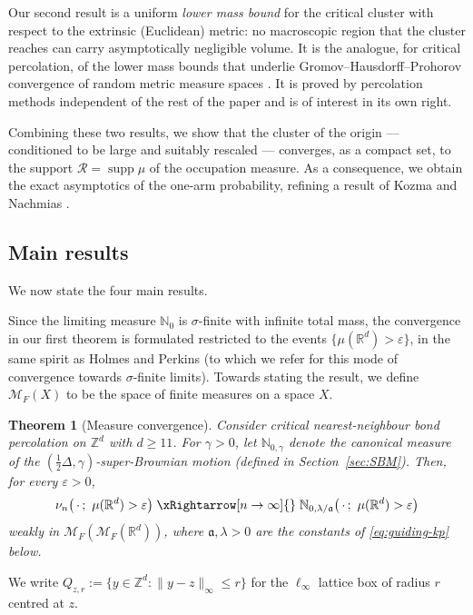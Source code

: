 \documentclass[11pt]{article}
\newtheorem{theorem}{Theorem}[section]
\theoremstyle{definition}
\theoremstyle{remark}
\newcommand{\R}{\mathbb{R}}
\newcommand{\Z}{\mathbb{Z}}
\newcommand{\bN}{{\mathbb{N}_0}}                 %
\newcommand{\cMM}{{\mathcal{M}_F(\mathcal{M}_F(\R^d))}}
\newcommand{\supp}{\operatorname{supp}}
\newcommand{\Ran}{\mathcal{R}}                 %
\newcommand{\eps}{\varepsilon}
\numberwithin{equation}{section}
\theoremstyle{plain}
\theoremstyle{definition}
\theoremstyle{remark}
\theoremstyle{plain}
\begin{document}
Our second result is a uniform \emph{lower mass bound} for the critical
cluster with respect to the extrinsic (Euclidean) metric: no macroscopic region that the cluster reaches can carry
asymptotically negligible volume. It is the analogue, for critical
percolation, of the lower mass bounds that underlie Gromov--Hausdorff--Prohorov
convergence of random metric measure spaces \cite{ALW16}. It is proved by
percolation methods independent of the rest of the paper and is of interest in
its own right.

Combining these two results, we show that the cluster of the origin --- conditioned
to be large and suitably rescaled --- converges, as a compact set, to the
support $\Ran=\supp\mu$ of the occupation measure. As a consequence, we obtain
the exact asymptotics of the one-arm probability, refining a result of Kozma and Nachmias \cite{KN11}.


\subsection{Main results}\label{sec:mainresults}

We now state the four main results.

Since the limiting measure $\bN$ is $\sigma$-finite with infinite total mass, the convergence in our first theorem is formulated restricted to the events $\{\mu(\R^d)>\eps\}$, in the same spirit as Holmes and Perkins \cite{HP07} (to which we refer for this mode of convergence towards $\sigma$-finite limits). Towards stating the result, we define $\mathcal{M}_F(X)$ to be the space of finite measures on a space $X$.

\begin{theorem}[Measure convergence]\label{thm:mainA}
Consider critical nearest-neighbour bond percolation on $\Z^d$ with $d\geq 11$. For $\gamma>0$, let $\mathbb{N}_{0,\gamma}$ denote the canonical measure of the $(\tfrac12\Delta,\gamma)$-super-Brownian motion (defined in Section~\ref{sec:SBM}). Then, for every
$\eps>0$,
\[
\nu_n\bigl(\,\cdot\,;\ \mu(\R^d)>\eps\bigr)
\;\xRightarrow[n\to\infty]{}\;
\mathbb{N}_{0,\lambda/\mathfrak a}\bigl(\,\cdot\,;\ \mu(\R^d)>\eps\bigr)
\]
weakly in $\cMM$, where $\mathfrak a,\lambda>0$ are the constants 
of \eqref{eq:guiding-kp} below.

\end{theorem}

We write
$Q_{z,r}:=\{y\in\Z^d:\lVert y-z\rVert_\infty\le r\}$ for the $\ell_\infty$ lattice
box of radius $r$ centred at $z$.
\end{document}
